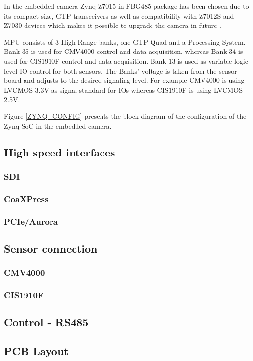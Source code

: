 In the embedded camera Zynq Z7015 in FBG485 package has been chosen due to its compact size, GTP transceivers as well as compatibility with Z7012S and Z7030 devices which makes it possible to upgrade the camera in future \cite{ZYNQ_COMPATIBILITY}.

MPU consists of 3 High Range banks, one GTP Quad and a Processing System.
Bank 35 is used for CMV4000 control and data acquisition, whereas Bank 34 is used for CIS1910F control and data acquisition. Bank 13 is used as variable logic level IO control for both sensors. The Banks' voltage is taken from the sensor board and adjusts to the desired signaling level. For example CMV4000 is using LVCMOS 3.3V as signal standard for IOs whereas CIS1910F is using LVCMOS 2.5V.

Figure \ref{ZYNQ_CONFIG} presents the block diagram of the configuration of the Zynq SoC in the embedded camera. 
 
\subsection{High speed interfaces}
\subsubsection{SDI}
\subsubsection{CoaXPress}
\subsubsection{PCIe/Aurora}

\subsection{Sensor connection}

\subsubsection{CMV4000}
\subsubsection{CIS1910F}

\subsection{Control - RS485}
\subsection{PCB Layout}

